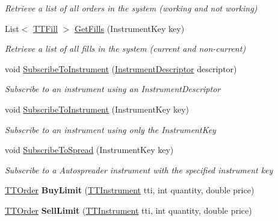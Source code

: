 \begin{DoxyCompactItemize}
\begin{DoxyCompactList}\small\item\em Retrieve a list of all orders in the system (working and not working) \end{DoxyCompactList}\item 
List$<$ \hyperlink{class_e_z_a_p_i_1_1_containers_1_1_t_t_fill}{T\-T\-Fill} $>$ \hyperlink{class_e_z_a_p_i_1_1_t_t_a_p_i_functions_a2abb48f9e5c38dcac115fccb493d1792}{Get\-Fills} (Instrument\-Key key)
\begin{DoxyCompactList}\small\item\em Retrieve a list of all fills in the system (current and non-\/current) \end{DoxyCompactList}\item 
void \hyperlink{class_e_z_a_p_i_1_1_t_t_a_p_i_functions_afdbf19a7fa3e0880d1e336d24b7f79ce}{Subscribe\-To\-Instrument} (\hyperlink{class_e_z_a_p_i_1_1_containers_1_1_instrument_descriptor}{Instrument\-Descriptor} descriptor)
\begin{DoxyCompactList}\small\item\em Subscribe to an instrument using an Instrument\-Descriptor \end{DoxyCompactList}\item 
void \hyperlink{class_e_z_a_p_i_1_1_t_t_a_p_i_functions_a27f344df275d1a24f403a9444a2391e3}{Subscribe\-To\-Instrument} (Instrument\-Key key)
\begin{DoxyCompactList}\small\item\em Subscribe to an instrument using only the Instrument\-Key \end{DoxyCompactList}\item 
void \hyperlink{class_e_z_a_p_i_1_1_t_t_a_p_i_functions_a0ba98a1fd49a33baa8ae1eae18a08326}{Subscribe\-To\-Spread} (Instrument\-Key key)
\begin{DoxyCompactList}\small\item\em Subscribe to a Autospreader instrument with the specified instrument key \end{DoxyCompactList}\item 
\hypertarget{class_e_z_a_p_i_1_1_t_t_a_p_i_functions_aa1f9e57638cf41f3d9d199906c75fc3f}{\hyperlink{class_e_z_a_p_i_1_1_containers_1_1_t_t_order}{T\-T\-Order} {\bfseries Buy\-Limit} (\hyperlink{class_e_z_a_p_i_1_1_containers_1_1_t_t_instrument}{T\-T\-Instrument} tti, int quantity, double price)}\label{class_e_z_a_p_i_1_1_t_t_a_p_i_functions_aa1f9e57638cf41f3d9d199906c75fc3f}

\item 
\hypertarget{class_e_z_a_p_i_1_1_t_t_a_p_i_functions_a09686dbe6bf0f0c3acf4992b10422f56}{\hyperlink{class_e_z_a_p_i_1_1_containers_1_1_t_t_order}{T\-T\-Order} {\bfseries Sell\-Limit} (\hyperlink{class_e_z_a_p_i_1_1_containers_1_1_t_t_instrument}{T\-T\-Instrument} tti, int quantity, double price)}\label{class_e_z_a_p_i_1_1_t_t_a_p_i_functions_a09686dbe6bf0f0c3acf4992b10422f56}


\end{DoxyCompactItemize}

